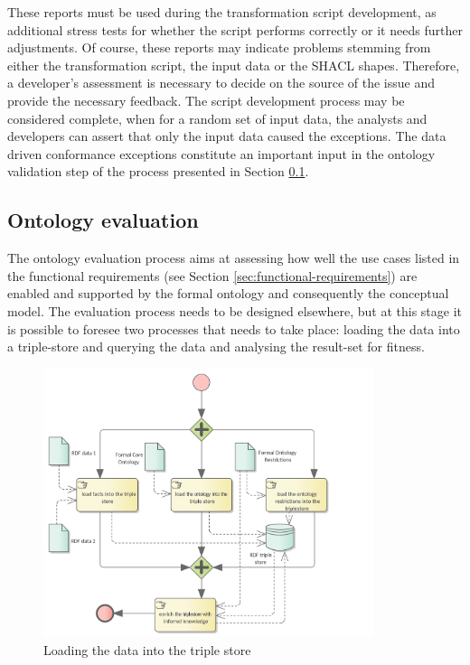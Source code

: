 	These reports must be used during the transformation script development, as additional stress tests for whether the script performs correctly or it needs further adjustments. Of course, these reports may indicate problems stemming from either the transformation script, the input data or the SHACL shapes. Therefore, a developer's assessment is necessary to decide on the source of the issue and provide the necessary feedback. The script development process may be considered complete, when for a random set of input data, the analysts and developers can assert that only the input data caused the exceptions. The data driven conformance exceptions constitute an important input in the ontology validation step of the process presented in Section \ref{sec:ontology-validation}.
	
	\subsection{Ontology evaluation}
	\label{sec:ontology-validation}
	
	The ontology evaluation process aims at assessing how well the use cases listed in the functional requirements (see Section \ref{sec:functional-requirements}) are enabled and supported by the formal ontology and consequently the conceptual model. The evaluation process needs to be designed elsewhere, but at this stage it is possible to foresee two processes that needs to take place: loading the data into a triple-store and querying the data and analysing the result-set for fitness. 

	\begin{figure}[!ht]		
		\centering
		\includegraphics[width=0.86\textwidth]{../img/loading-data.png}
		\caption{Loading the data into the triple store}
		\label{fig:loading-date}
	\end{figure}

